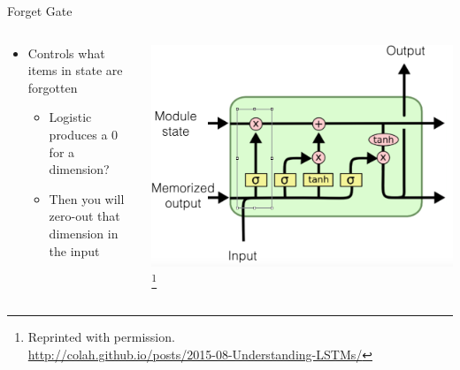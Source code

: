 \documentclass[aspectratio=169]{beamer}
\begin{document}
\begin{frame}{Forget Gate}

\begin{columns}
\begin{column}{0.5\textwidth}
\begin{itemize}
	\item Controls what items in state are forgotten
	\begin{itemize}
		\item Logistic produces a 0 for a dimension?
		\item Then you will zero-out that dimension in the input
	\end{itemize}
\end{itemize}
\end{column}
\begin{column}{0.5\textwidth}
\includegraphics[width=1\textwidth]{lectLSTM/dampen.png}
\footnote{Reprinted with permission.\\ \hspace{1.7em}\url{http://colah.github.io/posts/2015-08-Understanding-LSTMs/}}
\end{column}
\end{columns}
\end{frame}
\end{document}
